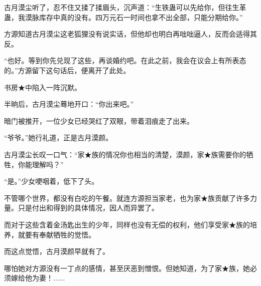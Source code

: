 \begin{this_body}
古月漠尘听了，忍不住又揉了揉眉头，沉声道：“生铁蛊可以先给你，但往生革蛊，我漠脉库存中真的没有。四万元石一时间也拿不出全部，只能分期给你。”

方源知道古月漠尘这老狐狸没有说实话，但他却也明白再咄咄逼人，反而会适得其反。

“也好。等到你先兑现了这些，再谈婚约吧。在此之前，我会在议会上有所表态的。”方源留下这句话后，便离开了此处。

书房★中陷入一阵沉默。

半晌后，古月漠尘蓦地开口：“你出来吧。”

暗门被推开，一位少女已经哭红了双眼，带着泪痕走了出来。

“爷爷。”她行礼道，正是古月漠颜。

古月漠尘长叹一口气：“家★族的情况你也相当的清楚，漠颜，家★族需要你的牺牲，你能理解吗？”

“是。”少女哽咽着，低下了头。

不管哪个世界，都没有白吃的午餐。就连方源担当家老，也为家★族贡献了许多力量。只是付出和得到的具体情况，因人而异罢了。

而对于这些含着金汤匙出生的少年，同样也没有无偿的权利，他们享受家★族的培养，就要有奉献牺牲的觉悟。

而这点觉悟，古月漠颜早就有了。

哪怕她对方源没有一丁点的感情，甚至厌恶到憎恨。但她知道，为了家★族，她必须嫁给他为妻！......

\end{this_body}

